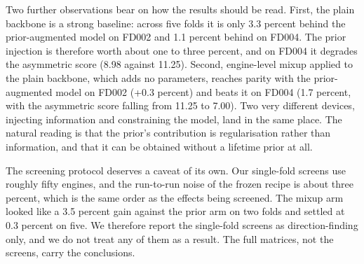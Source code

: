 
Two further observations bear on how the results should be read. First, the plain backbone is a strong baseline: across five folds it is only 3.3 percent behind the prior-augmented model on FD002 and 1.1 percent behind on FD004. The prior injection is therefore worth about one to three percent, and on FD004 it degrades the asymmetric score (8.98 against 11.25). Second, engine-level mixup applied to the plain backbone, which adds no parameters, reaches parity with the prior-augmented model on FD002 (+0.3 percent) and beats it on FD004 (1.7 percent, with the asymmetric score falling from 11.25 to 7.00). Two very different devices, injecting information and constraining the model, land in the same place. The natural reading is that the prior's contribution is regularisation rather than information, and that it can be obtained without a lifetime prior at all.

The screening protocol deserves a caveat of its own. Our single-fold screens use roughly fifty engines, and the run-to-run noise of the frozen recipe is about three percent, which is the same order as the effects being screened. The mixup arm looked like a 3.5 percent gain against the prior arm on two folds and settled at 0.3 percent on five. We therefore report the single-fold screens as direction-finding only, and we do not treat any of them as a result. The full matrices, not the screens, carry the conclusions.
